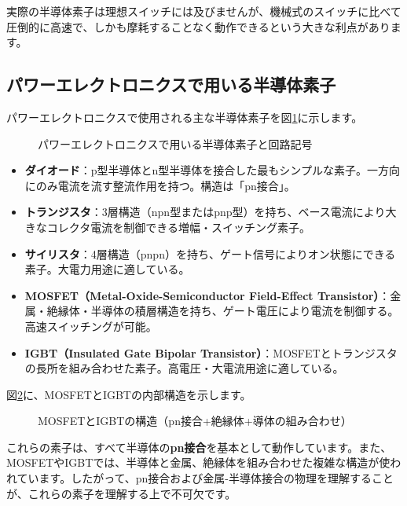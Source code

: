 実際の半導体素子は理想スイッチには及びませんが、機械式のスイッチに比べて圧倒的に高速で、しかも摩耗することなく動作できるという大きな利点があります。

\subsection{パワーエレクトロニクスで用いる半導体素子}

パワーエレクトロニクスで使用される主な半導体素子を図\ref{fig:devices}に示します。

\begin{figure}[H]
\centering
{}
\caption{パワーエレクトロニクスで用いる半導体素子と回路記号}
\label{fig:devices}
\end{figure}

\begin{itemize}
\item \textbf{ダイオード}：p型半導体とn型半導体を接合した最もシンプルな素子。一方向にのみ電流を流す整流作用を持つ。構造は「pn接合」。

\item \textbf{トランジスタ}：3層構造（npn型またはpnp型）を持ち、ベース電流により大きなコレクタ電流を制御できる増幅・スイッチング素子。

\item \textbf{サイリスタ}：4層構造（pnpn）を持ち、ゲート信号によりオン状態にできる素子。大電力用途に適している。

\item \textbf{MOSFET（Metal-Oxide-Semiconductor Field-Effect Transistor）}：金属・絶縁体・半導体の積層構造を持ち、ゲート電圧により電流を制御する。高速スイッチングが可能。

\item \textbf{IGBT（Insulated Gate Bipolar Transistor）}：MOSFETとトランジスタの長所を組み合わせた素子。高電圧・大電流用途に適している。
\end{itemize}

図\ref{fig:mosfet_igbt}に、MOSFETとIGBTの内部構造を示します。

\begin{figure}[H]
\centering
{}
\caption{MOSFETとIGBTの構造（pn接合+絶縁体+導体の組み合わせ）}
\label{fig:mosfet_igbt}
\end{figure}

これらの素子は、すべて半導体の\textbf{pn接合}を基本として動作しています。また、MOSFETやIGBTでは、半導体と金属、絶縁体を組み合わせた複雑な構造が使われています。したがって、pn接合および金属-半導体接合の物理を理解することが、これらの素子を理解する上で不可欠です。


